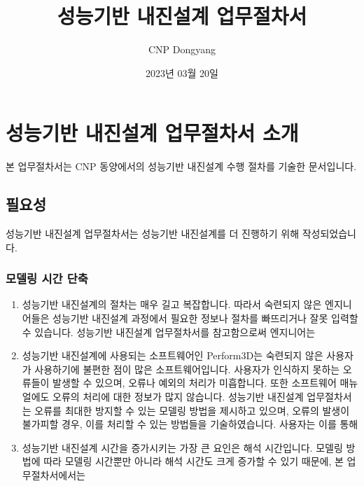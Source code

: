 \documentclass[a4paper,11pt,korean,openany,oneside]{sphinxmanual}
\title{성능기반 내진설계 업무절차서}
\date{2023년 03월 20일}
\author{CNP Dongyang}
\begin{document}
\pagestyle{empty}
\sphinxmaketitle
\pagestyle{plain}
\sphinxtableofcontents
\pagestyle{normal}
\label{\detokenize{pbd_p3d_manual_latex::doc}}


\sphinxstepscope


\chapter{성능기반 내진설계 업무절차서 소개}
\label{\detokenize{0_intro_latex:id1}}\label{\detokenize{0_intro_latex::doc}}
\sphinxAtStartPar
본 업무절차서는 CNP 동양에서의 성능기반 내진설계 수행 절차를 기술한 문서입니다.


\section{필요성}
\label{\detokenize{0_intro_latex:id2}}
\sphinxAtStartPar
성능기반 내진설계 업무절차서는 성능기반 내진설계를 더  진행하기 위해 작성되었습니다.


\subsection{모델링 시간 단축}
\label{\detokenize{0_intro_latex:id3}}\begin{enumerate}
%
\item {} 
\sphinxAtStartPar
성능기반 내진설계의 절차는 매우 길고 복잡합니다.
따라서 숙련되지 않은 엔지니어들은 성능기반 내진설계 과정에서 필요한 정보나 절차를 빠뜨리거나 잘못 입력할 수 있습니다.
성능기반 내진설계 업무절차서를 참고함으로써 엔지니어는 

\item {} 
\sphinxAtStartPar
성능기반 내진설계에 사용되는 소프트웨어인 Perform\sphinxhyphen{}3D는 숙련되지 않은 사용자가 사용하기에 불편한 점이 많은 소프트웨어입니다.
사용자가 인식하지 못하는 오류들이 발생할 수 있으며, 오류나 예외의 처리가 미흡합니다. 또한 소프트웨어 매뉴얼에도 오류의 처리에 대한 정보가 많지 않습니다.
성능기반 내진설계 업무절차서는 오류를 최대한 방지할 수 있는 모델링 방법을 제시하고 있으며,
오류의 발생이 불가피할 경우, 이를 처리할 수 있는 방법들을 기술하였습니다.
사용자는 이를 통해 

\item {} 
\sphinxAtStartPar
성능기반 내진설계 시간을 증가시키는 가장 큰 요인은 해석 시간입니다.
모델링 방법에 따라 모델링 시간뿐만 아니라 해석 시간도 크게 증가할 수 있기 때문에,
본 업무절차서에서는 

\end{enumerate}
\end{document}
